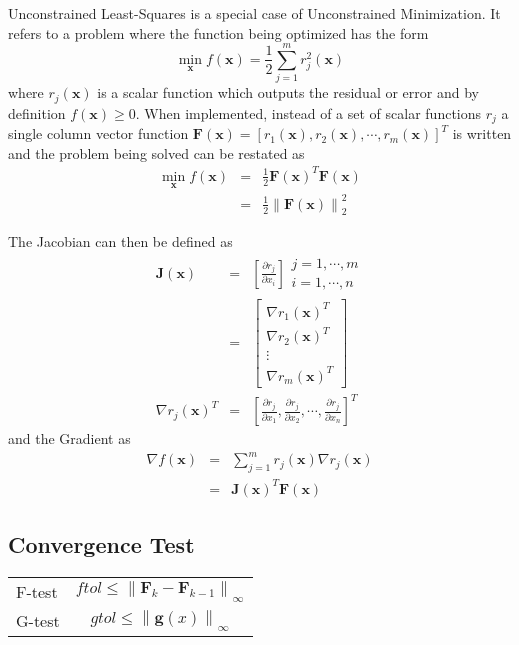 \documentclass[peerreview,compsoc,onecolumn]{IEEEtran}
\newcommand{\norm}[1]{\left\lVert#1\right\rVert}
\begin{document}
Unconstrained Least-Squares is a special case of Unconstrained Minimization. It refers to a problem where the function being optimized has the form
\begin{equation}
\min\limits_{\bm{x}} f(\bm{x})=\frac{1}{2}\sum^m_{j=1} r^2_j(\bm{x})
\end{equation}
where $r_j(\bm{x})$ is a scalar function which outputs the residual or error and by definition $f(\bm{x}) \ge 0$. When implemented, instead of a set of scalar functions $r_j$ a single column vector function $\bm{F}(\bm{x}) = [ r_1(\bm{x}) , r_2(\bm{x}) , \cdots , r_m(\bm{x}) ]^T$ is written and the problem being solved can be restated as
\begin{eqnarray}
\min\limits_{\bm{x}} f(\bm{x})&=&\frac{1}{2} \bm{F}(\bm{x})^T \bm{F}(\bm{x})\\
&=& \frac{1}{2} \norm{\bm{F}(\bm{x})}^2_2
\end{eqnarray}

The Jacobian can then be defined as
\begin{eqnarray}
\bm{J}(\bm{x}) &=& \left[\frac{\partial r_j}{\partial x_i}\right]\begin{array}{l}j=1,\cdots,m\\i=1,\cdots,n \end{array} \\
&=& \left[ \begin{array}{c}\nabla r_1(\bm{x})^T \\ \nabla r_2(\bm{x})^T \\ \vdots \\ \nabla r_m(\bm{x})^T \end{array}\right] \\
\nabla r_j(\bm{x})^T &=& \left[ \frac{\partial r_j}{\partial x_1},\frac{\partial r_j}{\partial x_2}, \cdots , \frac{\partial r_j}{\partial x_n} \right]^T
\end{eqnarray}
and the Gradient as
\begin{eqnarray}
\nabla f(\bm{x}) &=& \sum^m_{j=1}r_j(\bm{x})\nabla r_j(\bm{x}) \\
&=& \bm{J}(\bm{x})^T \bm{F}(\bm{x})
\end{eqnarray}

\subsection{Convergence Test}
\begin{center}
\begin{tabular}{lc}
F-test & $ftol \leq \norm{\bm{F}_k-\bm{F}_{k-1}}_\infty$ \\
G-test & $gtol \leq \norm{\bm{g}(x)}_\infty$ \\
\end{tabular}
\end{center}
\end{document}
